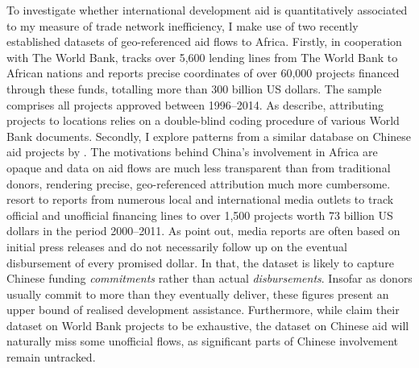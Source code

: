 \documentclass[11pt, oneside]{article}   	%
\begin{document}
To investigate whether international development aid is quantitatively associated to my measure of trade network inefficiency, I make use of two recently established datasets of geo-referenced aid flows to Africa. Firstly,  \cite{AidData_WorldBankGeocoded_2017} in cooperation with The World Bank, tracks over 5,600 lending lines from The World Bank to African nations and reports precise coordinates of over 60,000 projects financed through these funds, totalling more than 300 billion US dollars. The sample comprises all projects approved between 1996--2014. As \cite{Strandow_UCDPAidDatacodebook_2011a} describe, attributing projects to locations relies on a double-blind coding procedure of various World Bank documents. Secondly, I explore patterns from a  similar database on Chinese aid projects by \cite{Strange_TrackingUnderreportedFinancial_2017}. The motivations behind China's involvement in Africa are opaque and data on aid flows are much less transparent than from traditional donors, rendering precise, geo-referenced attribution much more cumbersome. \citeauthor{Strange_TrackingUnderreportedFinancial_2017} resort to reports from numerous local and international media outlets to track official and unofficial financing lines to over 1,500 projects worth 73 billion US dollars in the period 2000--2011. As \citeauthor{Strange_TrackingUnderreportedFinancial_2017} point out, media reports are often based on initial press releases and do not necessarily follow up on the eventual disbursement of every promised dollar. In that, the dataset is likely to capture Chinese funding \emph{commitments} rather than actual \emph{disbursements}. Insofar as donors usually commit to more than they eventually deliver, these figures present an upper bound of realised development assistance. Furthermore, while \cite{AidData_WorldBankGeocoded_2017} claim their dataset on World Bank projects to be exhaustive, the dataset on Chinese aid will naturally miss some unofficial flows, as significant parts of Chinese involvement remain untracked.
\end{document}
